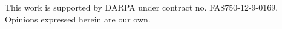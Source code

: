 \documentclass{sigplanconf}
\begin{document}



\acks

This work is supported by DARPA under contract no. FA8750-12-9-0169.  Opinions
expressed herein are our own.








\end{document}
